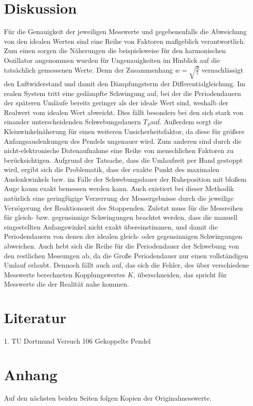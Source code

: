 \section{Diskussion}
\label{sec:diskussion}
Für die Genauigkeit der jeweiligen Messwerte und gegebenenfalls die Abweichung von den idealen Werten 
sind eine Reihe von Faktoren maßgeblich verantwortlich. \newline 
Zum einen sorgen die Näherungen die beispielsweise für den harmonischen Oszillator angenommen wurden für 
Ungenauigkeiten im Hinblick auf die tatsächlich gemessenen Werte. Denn der Zusammenhang 
$w=\sqrt{\frac{g}{l}}$ vernachlässigt den Luftwiderstand und damit den Dämpfungsterm der 
Differentialgleichung. Im realen System tritt eine gedämpfte Schwingung auf, bei der die 
Periodendauern der späteren Umläufe bereits geringer als der ideale Wert sind, weshalb der 
Realwert vom idealen Wert abweicht. Dies fällt besonders bei den sich stark von einander
unterscheidenden Schwebungsdauern $T_S$auf. Außerdem sorgt die Kleinwinkelnäherung für einen weiteren
 Unsicherheitsfaktor, da diese für größere Anfangsauslenkungen des Pendels ungenauer wird. \newline
Zum anderen sind durch die nicht-elektronische Datenaufnahme eine Reihe von menschlichen Faktoren 
zu berücksichtigen. \newline
Aufgrund der Tatsache, dass die Umlaufzeit per Hand gestoppt wird, ergibt sich die Problematik, 
dass der exakte Punkt des maximalen Auslenkwinkels bzw. im Falle der Schwebungsdauer der Ruheposition 
mit bloßem Auge kaum exakt bemessen werden kann. Auch existiert bei dieser Methodik natürlich eine 
geringfügige Verzerrung der Messergebnisse durch die jeweilige Verzögerung der Reaktionszeit des Stoppenden.
 Zuletzt muss für die Messreihen für gleich- bzw. gegensinnige Schwingungen beachtet werden, dass die 
 manuell eingestellten Anfangswinkel nicht exakt übereinstimmen, und damit die Periodendauern von denen der 
 idealen gleich- oder gegensinnigen Schwingungen abweichen. Auch hebt sich die Reihe für die Periodendauer 
 der Schwebung von den restlichen Messungen ab, da die Große Periodendauer nur einen vollständigen Umlauf 
 erlaubt.
 Dennoch fällt auch auf, das sich die Fehler, des über verschiedene Messwerte berechneten
 Kopplungswertes $K$, überschneiden, das spricht für Messwerte die der Realität nahe kommen.  
\section{Literatur}
\label{sec:literatur}
1. TU Dortmund Versuch 106 Gekoppelte Pendel\\
\section{Anhang}
\label{sec:anhang}
Auf den nächsten beiden Seiten folgen Kopien der Originalmesswerte.